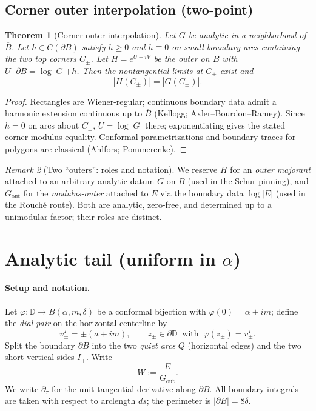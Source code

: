 \documentclass[11pt]{article}
\numberwithin{equation}{section}
\newtheorem{theorem}{Theorem}[section]
\theoremstyle{remark}
\newtheorem{remark}[theorem]{Remark}
\newcommand{\D}{\mathbb{D}}
\newcommand{\Gout}{G_{\mathrm{out}}}
\begin{document}
\subsection{Corner outer interpolation (two-point)}\label{subsec:corner-interp}

\begin{theorem}[Corner outer interpolation]\label{thm:corner-outer}
Let $G$ be analytic in a neighborhood of $\overline B$. Let $h\in C(\partial B)$ satisfy $h\ge 0$ and $h\equiv 0$ on small boundary arcs containing the two top corners $C_\pm$. Let $H=e^{U+iV}$ be the outer on $B$ with $U|\_{\partial B}=\log|G|+h$. Then the nontangential limits at $C_\pm$ exist and
\[
|H(C_\pm)|=|G(C_\pm)|.
\]
\end{theorem}

\begin{proof}
Rectangles are Wiener-regular; continuous boundary data admit a harmonic extension continuous up to $\overline B$ (Kellogg; Axler--Bourdon--Ramey). Since $h=0$ on arcs about $C_\pm$, $U=\log|G|$ there; exponentiating gives the stated corner modulus equality. Conformal parametrizations and boundary traces for polygons are classical (Ahlfors; Pommerenke).
\end{proof}

\begin{remark}[Two “outers”: roles and notation]
We reserve $H$ for an \emph{outer majorant} attached to an arbitrary analytic datum $G$ on $B$ (used in the Schur pinning), and $\Gout$ for the \emph{modulus-outer} attached to $E$ via the boundary data $\log|E|$ (used in the Rouch\'e route). Both are analytic, zero-free, and determined up to a unimodular factor; their roles are distinct.
\end{remark}

\section{Analytic tail (uniform in \texorpdfstring{$\alpha$}{alpha})}\label{sec:tail}

\paragraph{Setup and notation.}
Let $\varphi:\D\to B(\alpha,m,\delta)$ be a conformal bijection with $\varphi(0)=\alpha+im$; define the \emph{dial pair} on the horizontal centerline by
\[
v_\pm^\star=\pm(a+im),\qquad z_\pm\in\partial\D\ \text{ with }\ \varphi(z_\pm)=v_\pm^\star.
\]
Split the boundary $\partial B$ into the two \emph{quiet arcs} $Q$ (horizontal edges) and the two short vertical sides $I_\pm$.
Write
\[
W:=\frac{E}{\Gout}.
\]
We write $\partial_\tau$ for the unit tangential derivative along $\partial B$. All boundary integrals are taken with respect to arclength $ds$; the perimeter is $|\partial B|=8\delta$.
\end{document}
